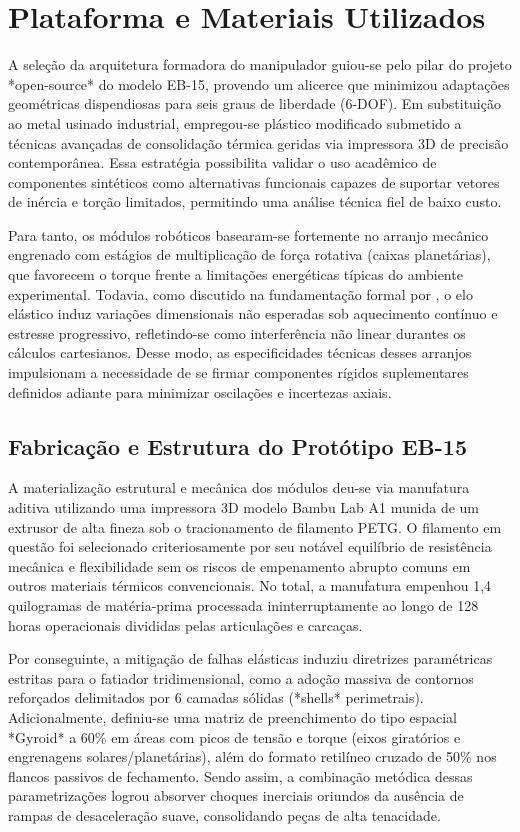 \section{Plataforma e Materiais Utilizados}

A seleção da arquitetura formadora do manipulador guiou-se pelo pilar do projeto *open-source* do modelo EB-15, provendo um alicerce que minimizou adaptações geométricas dispendiosas para seis graus de liberdade (6-DOF). Em substituição ao metal usinado industrial, empregou-se plástico modificado submetido a técnicas avançadas de consolidação térmica geridas via impressora 3D de precisão contemporânea. Essa estratégia possibilita validar o uso acadêmico de componentes sintéticos como alternativas funcionais capazes de suportar vetores de inércia e torção limitados, permitindo uma análise técnica fiel de baixo custo.

Para tanto, os módulos robóticos basearam-se fortemente no arranjo mecânico engrenado com estágios de multiplicação de força rotativa (caixas planetárias), que favorecem o torque frente a limitações energéticas típicas do ambiente experimental. Todavia, como discutido na fundamentação formal por , o elo elástico induz variações dimensionais não esperadas sob aquecimento contínuo e estresse progressivo, refletindo-se como interferência não linear durantes os cálculos cartesianos. Desse modo, as especificidades técnicas desses arranjos impulsionam a necessidade de se firmar componentes rígidos suplementares definidos adiante para minimizar oscilações e incertezas axiais.

\subsection{Fabricação e Estrutura do Protótipo EB-15}

A materialização estrutural e mecânica dos módulos deu-se via manufatura aditiva utilizando uma impressora 3D modelo Bambu Lab A1 munida de um extrusor de alta fineza sob o tracionamento de filamento PETG. O filamento em questão foi selecionado criteriosamente por seu notável equilíbrio de resistência mecânica e flexibilidade sem os riscos de empenamento abrupto comuns em outros materiais térmicos convencionais. No total, a manufatura empenhou 1,4 quilogramas de matéria-prima processada ininterruptamente ao longo de 128 horas operacionais divididas pelas articulações e carcaças.

Por conseguinte, a mitigação de falhas elásticas induziu diretrizes paramétricas estritas para o fatiador tridimensional, como a adoção massiva de contornos reforçados delimitados por 6 camadas sólidas (*shells* perimetrais). Adicionalmente, definiu-se uma matriz de preenchimento do tipo espacial *Gyroid* a 60\% em áreas com picos de tensão e torque (eixos giratórios e engrenagens solares/planetárias), além do formato retilíneo cruzado de 50\% nos flancos passivos de fechamento. Sendo assim, a combinação metódica dessas parametrizações logrou absorver choques inerciais oriundos da ausência de rampas de desaceleração suave, consolidando peças de alta tenacidade.

